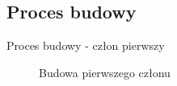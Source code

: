 \documentclass{beamer}
\begin{document}
\subsection{Proces budowy}
\begin{frame}{Proces budowy - człon pierwszy }
	\begin{figure}%
		\centering
		\qquad
		\caption{Budowa pierwszego członu}
		\label{fig:konstrukcja:czlon1}%
	\end{figure}
\end{frame}
\end{document}
